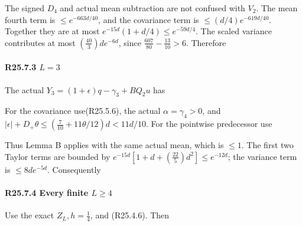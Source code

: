The signed \(D_4\) and actual mean subtraction are not confused with \(V_{2}\). The mean fourth term is \(\le e^{-663d/40}\), and the covariance term is \(\le (d/4)e^{-619d/40}\). Together they are at most \(e^{-15d}(1+d/4)\le e^{-59d/4}\). The scaled variance contributes at most \((\frac{40}{3})d e^{-6d}\), since \(\frac{607}{80}-\frac{13}{10}>6\). Therefore


\paragraph{R25.7.3 \(L=3\)}

The actual \(Y_{3}=(1+\epsilon)q-\gamma_{3}+B Q_2 u\) has


For the covariance use(R25.5.6), the actual \(\alpha=\gamma_{4}>0\), and \(\lvert \epsilon\rvert +D_+\theta\le (\frac{7}{10}+11\theta/12)d<11d/10\). For the pointwise predecessor use


Thus Lemma B applies with the same actual mean, which is \(\le 1\). The first two Taylor terms are bounded by \(e^{-15d}[1+d+(\frac{22}{5})d^2]\le e^{-12d}\); the variance term is \(\le 8d e^{-5d}\). Consequently


\paragraph{R25.7.4 Every finite \(L\ge 4\)}

Use the exact \(Z_L,\allowbreak \allowbreak  h=\frac{1}{4}\), and (R25.4.6). Then


